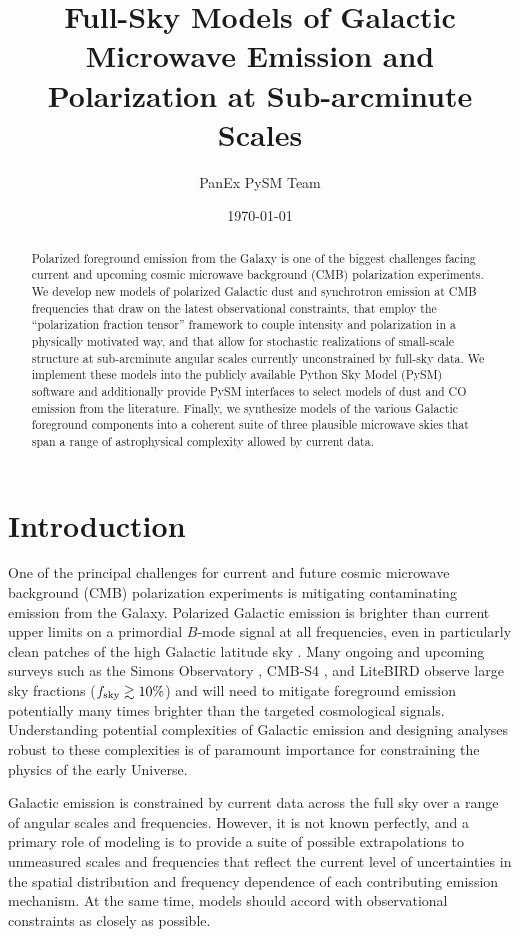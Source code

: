 \documentclass[twocolumn]{aastex631}
\begin{document}
\title{Full-Sky Models of Galactic Microwave Emission and Polarization at Sub-arcminute Scales}
\author{PanEx PySM Team}
\date{\today}

\begin{abstract}
Polarized foreground emission from the Galaxy is one of the biggest challenges facing current and upcoming cosmic microwave background (CMB) polarization experiments. We develop new models of polarized Galactic dust and synchrotron emission at CMB frequencies that draw on the latest observational constraints, that employ the ``polarization fraction tensor'' framework to couple intensity and polarization in a physically motivated way, and that allow for stochastic realizations of small-scale structure at sub-arcminute angular scales currently unconstrained by full-sky data. We implement these models into the publicly available Python Sky Model (PySM) software and additionally provide PySM interfaces to select models of dust and CO emission from the literature. Finally, we synthesize models of the various Galactic foreground components into a coherent suite of three plausible microwave skies that span a range of astrophysical complexity allowed by current data.
\end{abstract}

\section{Introduction}
One of the principal challenges for current and future cosmic microwave background (CMB) polarization experiments is mitigating contaminating emission from the Galaxy. Polarized Galactic emission is brighter than current upper limits on a primordial $B$-mode signal at all frequencies, even in particularly clean patches of the high Galactic latitude sky \citep{planck2016-l11A}. Many ongoing and upcoming surveys such as the Simons Observatory \citep{Ade:2019}, CMB-S4 \citep{Abazajian:2022}, and LiteBIRD \citep{LiteBIRDCollaboration:2023} observe large sky fractions ($f_{\rm sky} \gtrsim 10\%$) and will need to mitigate foreground emission potentially many times brighter than the targeted cosmological signals. Understanding potential complexities of Galactic emission and designing analyses robust to these complexities is of paramount importance for constraining the physics of the early Universe.

Galactic emission is constrained by current data across the full sky over a range of angular scales and frequencies. However, it is not known perfectly, and a primary role of modeling is to provide a suite of possible extrapolations to unmeasured scales and frequencies that reflect the current level of uncertainties in the spatial distribution and frequency dependence of each contributing emission mechanism. At the same time, models should accord with observational constraints as closely as possible.
\end{document}
